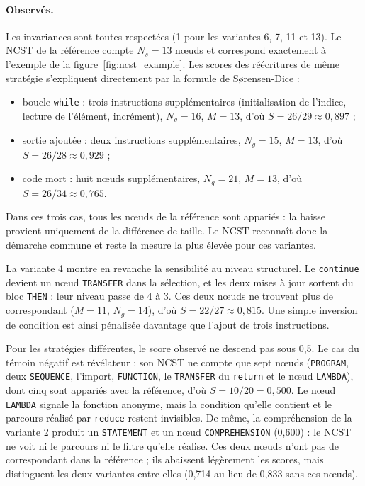 \documentclass[12pt,a4paper,oneside]{report}
\begin{document}
\paragraph{Observés.}
Les invariances sont toutes respectées (1 pour les variantes 6, 7, 11 et 13).
Le NCST de la référence compte $N_s = 13$ nœuds et correspond exactement à
l'exemple de la figure~\ref{fig:ncst_example}. Les scores des réécritures de
même stratégie s'expliquent directement par la formule de Sørensen-Dice :
\begin{itemize}
  \item boucle \texttt{while} : trois instructions supplémentaires
        (initialisation de l'indice, lecture de l'élément, incrément),
        $N_g = 16$, $M = 13$, d'où $S = 26/29 \approx 0{,}897$ ;
  \item sortie ajoutée : deux instructions supplémentaires, $N_g = 15$,
        $M = 13$, d'où $S = 26/28 \approx 0{,}929$ ;
  \item code mort : huit nœuds supplémentaires, $N_g = 21$, $M = 13$, d'où
        $S = 26/34 \approx 0{,}765$.
\end{itemize}
Dans ces trois cas, tous les nœuds de la référence sont appariés : la baisse
provient uniquement de la différence de taille. Le NCST reconnaît donc la
démarche commune et reste la mesure la plus élevée pour ces variantes.

La variante 4 montre en revanche la sensibilité au niveau structurel. Le
\texttt{continue} devient un nœud \texttt{TRANSFER} dans la sélection, et les
deux mises à jour sortent du bloc \texttt{THEN} : leur niveau passe de 4 à 3.
Ces deux nœuds ne trouvent plus de correspondant ($M = 11$, $N_g = 14$), d'où
$S = 22/27 \approx 0{,}815$. Une simple inversion de condition est ainsi
pénalisée davantage que l'ajout de trois instructions.

Pour les stratégies différentes, le score observé ne descend pas sous 0,5.
Le cas du témoin négatif est révélateur : son NCST ne compte que sept nœuds
(\texttt{PROGRAM}, deux \texttt{SEQUENCE}, l'import, \texttt{FUNCTION}, le
\texttt{TRANSFER} du \texttt{return} et le nœud \texttt{LAMBDA}), dont cinq
sont appariés avec la référence, d'où $S = 10/20 = 0{,}500$. Le nœud
\texttt{LAMBDA} signale la fonction anonyme, mais la condition qu'elle
contient et le parcours réalisé par \texttt{reduce} restent invisibles. De
même, la compréhension de la variante 2 produit un \texttt{STATEMENT} et un
nœud \texttt{COMPREHENSION} (0,600) : le NCST ne voit ni le parcours ni le
filtre qu'elle réalise. Ces deux nœuds n'ont pas de correspondant dans la
référence ; ils abaissent légèrement les scores, mais distinguent les deux
variantes entre elles (0,714 au lieu de 0,833 sans ces nœuds).
\end{document}
